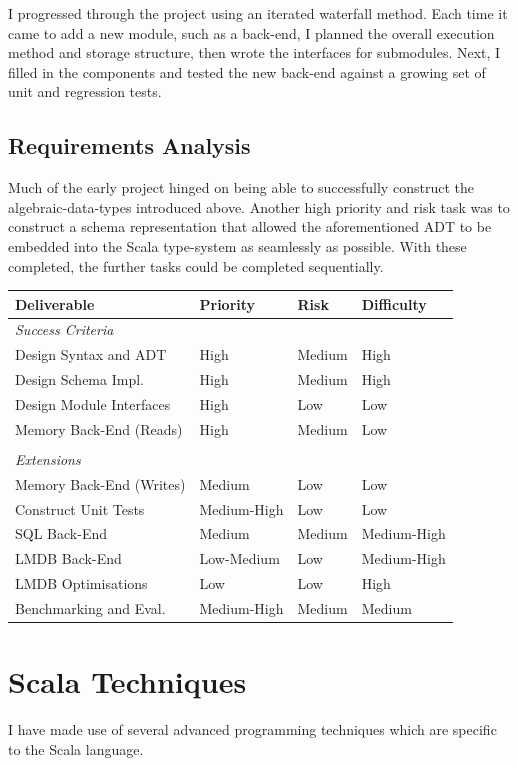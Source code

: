 \documentclass[12pt,a4paper,twoside,openright]{report}
\begin{document}
I progressed through the project using an iterated waterfall method. Each time it came to add a new module, such as a back-end, I planned the overall execution method and storage structure, then wrote the interfaces for submodules. Next, I filled in the components and tested the new back-end against a growing set of unit and regression tests.

\subsection{Requirements Analysis}
Much of the early project hinged on being able to successfully construct the algebraic-data-types introduced above. Another high priority and risk task was to construct a schema representation that allowed the aforementioned ADT to be embedded into the Scala type-system as seamlessly as possible. With these completed, the further tasks could be completed sequentially.

\begin{tabular}{p{5cm}p{3cm}p{2cm}p{3cm}}
\\
\hline
Deliverable & Priority & Risk & Difficulty \\
\hline
\textit{Success Criteria}\\
Design Syntax and ADT & High & Medium & High \\
Design Schema Impl. & High & Medium & High \\
Design Module Interfaces & High & Low & Low \\
Memory Back-End (Reads) & High & Medium & Low \\
\\
\hline
\textit{Extensions}\\
Memory Back-End (Writes) & Medium & Low & Low \\
Construct Unit Tests & Medium-High & Low & Low\\
SQL Back-End & Medium & Medium & Medium-High \\
LMDB Back-End & Low-Medium & Low & Medium-High \\
LMDB Optimisations & Low & Low & High \\
Benchmarking and Eval. & Medium-High & Medium & Medium
\\
\hline

\end{tabular}

\section{Scala Techniques}
I have made use of several advanced programming techniques which are specific to the Scala language.
\end{document}

